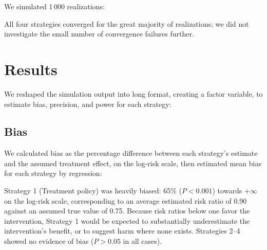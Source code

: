We simulated 1\,000 realizations:

\begin{minipage}{\linewidth}
\begin{stlog}
\nullskip
\end{stlog}
\end{minipage}

All four strategies converged for the great majority of realizations; we
did not investigate the small number of convergence failures further.


\section{Results}\label{sec:results}

We reshaped the simulation output into long format, creating a
 factor variable, to estimate bias, precision, and power for
each strategy:

\begin{minipage}{\linewidth}
\begin{stlog}
\nullskip
\end{stlog}
\end{minipage}

\subsection{Bias}

We calculated bias as the percentage difference between each strategy's
estimate and the assumed treatment effect, on the log-risk scale, then
estimated mean bias for each strategy by regression:

\begin{minipage}{\linewidth}
\begin{stlog}
\nullskip
\end{stlog}
\end{minipage}

Strategy 1 (Treatment policy) was heavily biased: 65\% ($P<0.001$) towards
$+\infty$ on the log-risk scale, corresponding to an average estimated
risk ratio of 0.90 against an assumed true value of 0.75. Because risk
ratios below one favor the intervention, Strategy 1 would be expected to
substantially underestimate the intervention's benefit, or to suggest harm
where none exists. Strategies 2--4 showed no evidence of bias ($P>0.05$ in
all cases).

